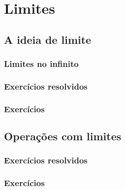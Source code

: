 
\chapter{Limites}\label{cap:limites}

\emconstrucao

\section{A ideia de limite}\label{sec:limites_ideia}
\subsection {Limites no infinito}
\construirSec

\subsection*{Exercícios resolvidos}

\construirExeresol


\subsection*{Exercícios}

\construirExer


\section{Operações com limites}\label{sec:limites_opera}
\construirSec

\subsection*{Exercícios resolvidos}

\construirExeresol


\subsection*{Exercícios}

